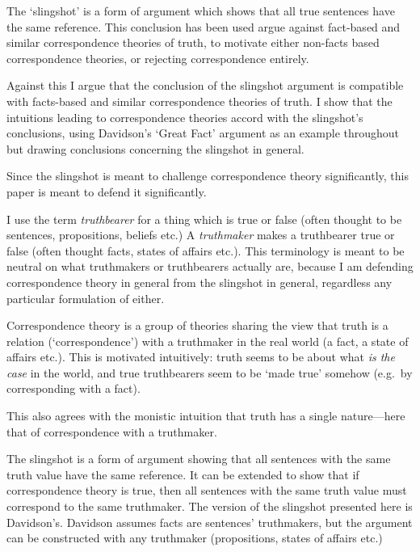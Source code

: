 The `slingshot' is a form of argument which shows that all true sentences have the same reference.
This conclusion has been used argue against fact-based and similar correspondence theories of truth, to motivate either non-facts based correspondence theories, or rejecting correspondence entirely.

Against this I argue that the conclusion of the slingshot argument is compatible with facts-based and similar correspondence theories of truth.
I show that the intuitions leading to correspondence theories accord with the slingshot's conclusions, using Davidson's `Great Fact' argument as an example throughout but drawing conclusions concerning the slingshot in general.

Since the slingshot is meant to challenge correspondence theory significantly, this paper is meant to defend it significantly.

I use the term \textit{truthbearer} for a thing which is true or false (often thought to be sentences, propositions, beliefs etc.)
A \textit{truthmaker} makes a truthbearer true or false (often thought facts, states of affairs etc.).
This terminology is meant to be neutral on what truthmakers or truthbearers actually are, because I am defending correspondence theory in general from the slingshot in general, regardless any particular formulation of either.

Correspondence theory is a group of theories sharing the view that truth is a relation (`correspondence') with a truthmaker in the real world (a fact, a state of affairs etc.).
This is motivated intuitively: truth seems to be about what \emph{is the case} in the world, and true truthbearers seem to be `made true' somehow (e.g.\ by corresponding with a fact).

This also agrees with the monistic intuition that truth has a single nature---here that of correspondence with a truthmaker.

The slingshot is a form of argument showing that all sentences with the same truth value have the same reference. %
It can be extended to show that if correspondence theory is true, then all sentences with the same truth value must correspond to the same truthmaker.
The version of the slingshot presented here is Davidson's.
\parencite[753]{Davidson_1969}
Davidson assumes facts are sentences' truthmakers, but the argument can be constructed with any truthmaker (propositions, states of affairs etc.)
\parencite[752]{Davidson_1969}

